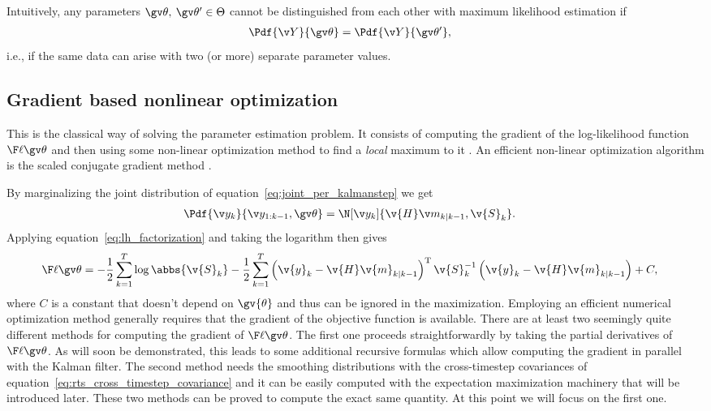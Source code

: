Intuitively, any parameters $\Th,\:\Th' \in \Theta$ cannot be distinguished
from each other with maximum likelihood estimation if
\begin{align}
	\Pdf{\Y}{\Th}&=\Pdf{\Y}{\Th'},
\end{align}
i.e., if the same data can arise with two (or more) separate
parameter values.
\parencite{Haykin2001,Cappe2005}

\subsection{Gradient based nonlinear optimization}\label{sec:grad}%

This is the classical way of solving the parameter estimation problem. It consists
of computing the gradient of the log-likelihood function $\lLH$ and then using some
non-linear optimization method to find a \emph{local} maximum to it 
\parencite{Mbalawataa,Cappe2005}. 
An efficient non-linear optimization algorithm is the scaled 
conjugate gradient method \parencite{Mbalawataa}.

By marginalizing the joint distribution of equation~\eqref{eq:joint_per_kalmanstep}
we get 
\begin{align}
	\Pdf{\y_k}{\y_{1:k-1},\Th}&=\N[\yk]{\v{H}\m_{k|k-1},\v{S}_k }.
\end{align}
Applying equation~\eqref{eq:lh_factorization} and taking the logarithm then gives
\begin{align}
	\lLH&=-\frac{1}{2}\sum_{k=1}^T\log\abbs{\v{S}_k}
	-\frac{1}{2}\sum_{k=1}^T\left(\v{y}_k-\v{H}\v{m}_{k|k-1}\right)^\tr\v{S}_{k}^{-1}\left(\v{y}_k-\v{H}\v{m}_{k|k-1}\right)+C,
	\label{eq:logLH}
\end{align}
where $C$ is a constant that doesn't depend on $\gv{\theta}$ and thus can
be ignored in the maximization.
Employing an efficient numerical optimization method generally
requires that the gradient of the objective function is available. 
There are at least two seemingly quite different methods for computing
the gradient of $\lLH$. The first one proceeds straightforwardly by taking the
partial derivatives of $\lLH$. As will soon be demonstrated, this leads
to some additional recursive formulas which allow computing
the gradient in parallel with the Kalman filter. The second method needs
the smoothing distributions with the cross-timestep covariances of equation~\eqref{eq:rts_cross_timestep_covariance}
and it can be easily computed with the expectation maximization machinery
that will be introduced later. These two methods can be proved to compute
the exact same quantity. At this point we will focus on the first one. 

